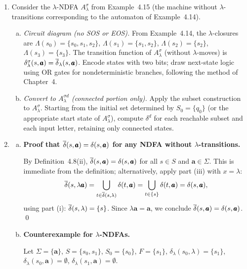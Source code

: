\begin{enumerate}[{4.}1.]
\item Consider the $\lambda$-NDFA $A^{\sigma}_\lambda$ from Example~4.15 (the
machine without $\lambda$-transitions corresponding to the automaton of
Example~4.14).

\begin{enumerate}[(a)]
  \item \emph{Circuit diagram (no SOS or EOS).}
  From Example~4.14, the $\lambda$-closures are
  $\Lambda(s_0)=\{s_0,s_1,s_2\}$, $\Lambda(s_1)=\{s_1,s_2\}$,
  $\Lambda(s_2)=\{s_2\}$, $\Lambda(s_3)=\{s_3\}$.
  The transition function of $A^{\sigma}_\lambda$ (without $\lambda$-moves)
  is $\delta^{\sigma}_\lambda(s,\pmb{a})=\overline{\delta}_\lambda(s,\pmb{a})$.
  Encode states with two bits; draw next-state logic using OR gates for
  nondeterministic branches, following the method of Chapter~4.

  \item \emph{Convert to $A^{\sigma d}_\lambda$ (connected portion only).}
  Apply the subset construction to $A^{\sigma}_\lambda$.  Starting from the
  initial set determined by $S_0=\{q_0\}$ (or the appropriate start state
  of $A^{\sigma}_\lambda$), compute $\delta^d$ for each reachable subset and
  each input letter, retaining only connected states.
\end{enumerate}

\item \begin{enumerate}[(a)]
  \item \textbf{Proof that $\overline{\delta}(s,\pmb{a})=\delta(s,\pmb{a})$ for any NDFA
  without $\lambda$-transitions.}

  By Definition~4.8(ii), $\overline{\delta}(s,\pmb{a})=\delta(s,\pmb{a})$ for all
  $s\in S$ and $\pmb{a}\in\Sigma$.  This is immediate from the definition;
  alternatively, apply part (iii) with $x=\lambda$:
  \[
    \overline{\delta}(s,\lambda\pmb{a})
    =\bigcup_{t\in\overline{\delta}(s,\lambda)}\delta(t,\pmb{a})
    =\bigcup_{t\in\{s\}}\delta(t,\pmb{a})
    =\delta(s,\pmb{a}),
  \]
  using part (i): $\overline{\delta}(s,\lambda)=\{s\}$.  Since $\lambda\pmb{a}=\pmb{a}$,
  we conclude $\overline{\delta}(s,\pmb{a})=\delta(s,\pmb{a})$. \qed

  \item \textbf{Counterexample for $\lambda$-NDFAs.}

  Let $\Sigma=\{\pmb{a}\}$, $S=\{s_0,s_1\}$, $S_0=\{s_0\}$, $F=\{s_1\}$,
  $\delta_\lambda(s_0,\lambda)=\{s_1\}$, $\delta_\lambda(s_0,\pmb{a})=\emptyset$,
  $\delta_\lambda(s_1,\pmb{a})=\emptyset$.


\end{enumerate}
\end{enumerate}
